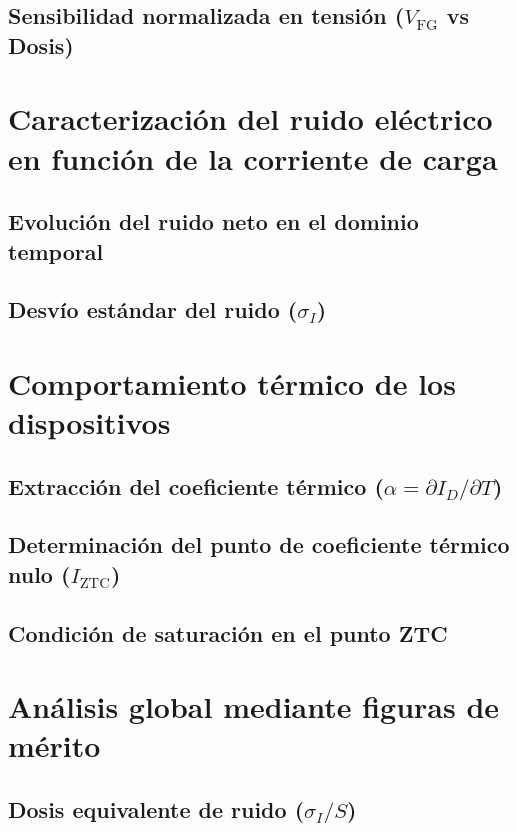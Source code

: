 \documentclass[12pt,a4paper,oneside]{book}
\begin{document}
\subsection[Sensibilidad normalizada en tensión]{Sensibilidad normalizada en tensión \texorpdfstring{($V_{\text{FG}}$ vs Dosis)}{(VFG vs Dosis)}}

\section{Caracterización del ruido eléctrico en función de la corriente de carga}
\subsection{Evolución del ruido neto en el dominio temporal}
\subsection{Desvío estándar del ruido \texorpdfstring{($\sigma_I$)}{(sigma\_I)}}

\section{Comportamiento térmico de los dispositivos}
\subsection[Extracción del coeficiente térmico]{Extracción del coeficiente térmico \texorpdfstring{($\alpha = \partial I_D / \partial T$)}{(alpha = dID/dT)}}
\subsection{Determinación del punto de coeficiente térmico nulo \texorpdfstring{($I_{\text{ZTC}}$)}{(IZTC)}}
\subsection{Condición de saturación en el punto ZTC}

\section{Análisis global mediante figuras de mérito}
\subsection{Dosis equivalente de ruido \texorpdfstring{($\sigma_I / S$)}{(sigma\_I / S)}}
\end{document}
